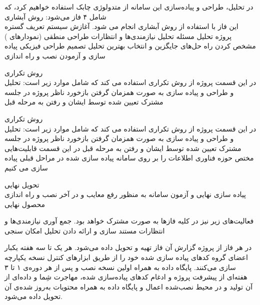 در تحلیل، طراحی و پیاده‌سازی این سامانه از متدولوژی چابک استفاده خواهیم کرد، که شامل ۴ فاز می‌شود:
 روش آبشاری\\
این فاز با استفاده از روش آبشاری انجام می شود.
 آغازش سیستم
 تعریف گستره پروژه
 تحلیل مسئله
 تحلیل نیازمندی‌ها و انتظارات 
 طراحی منطقی (‌نمودارهای )
 مشخص کردن راه حل‌های جایگزین و انتخاب بهترین 
 تحلیل تصمیم
 طراحی فیزیکی
 پیاده سازی و آزمودن
 نصب و راه اندازی
    
 روش تکراری\\
در این قسمت پروژه از روش تکراری استفاده می کند که شامل موارد زیر است:
 تحلیل و طراحی و پیاده سازی به صورت همزمان 
 گرفتن بازخورد ناظر پروژه در جلسه  مشترک تعیین شده توسط ایشان و رفتن به مرحله قبل


 روش تکراری\\
    در این قسمت پروژه از روش تکراری استفاده می کند که شامل موارد زیر است:
 تحلیل و طراحی و پیاده سازی به صورت همزمان 
 گرفتن بازخورد ناظر پروژه در جلسه  مشترک تعیین شده توسط ایشان و رفتن به مرحله قبل
در این قسمت قابلیت‌هایی مختص حوزه فناوری اطلاعات را بر روی سامانه پیاده سازی شده در مراحل قبلی پیاده سازی می کنیم 
   
   
 تحویل نهایی \\
پیاده سازی نهایی و آزمون سامانه به منظور رفع معایب و در آخر نصب و راه اندازی محصول نهایی

فعالیت‌های زیر نیز در کلیه فاز‌ها به صورت مشترک خواهد بود.
 جمع آوری نیازمندی‌ها و انتظارات
 مستند سازی و ارائه دادن 
 تحلیل امکان سنجی


 در هر فاز از پروژه گزارش آن فاز تهیه و تحویل داده می‌شود.
 هر یک تا سه هفته یکبار اعضای گروه کدهای پیاده سازی شده خود را از طریق ابزارهای کنترل نسخه یکپارچه سازی می‌کنند.
 پایگاه داده به همراه اولین نسخه نصب و پس از هر دوره‌ی ۱ تا ۳ هفته‌ای از پیشرفت پروژه و ادغام کد‌های پیاده‌سازی شده، مهاجرت شِما و داده‌ای از آن تولید و در محیط نصب‌شده اعمال و پایگاه داده به همراه محتویات به‌روز شده‌ی آن تحویل داده می‌شود.
